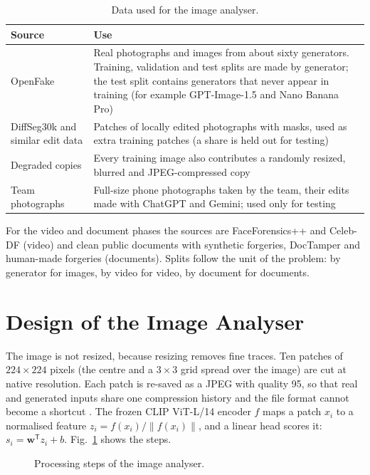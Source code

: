 \begin{table}[htbp]
\centering\small
\caption{Data used for the image analyser.}
\begin{tabularx}{\linewidth}{@{}p{3.3cm}X@{}}
\toprule
Source & Use\\
\midrule
OpenFake \cite{openfake} & Real photographs and images from about sixty generators. Training, validation and test splits are made by generator; the test split contains generators that never appear in training (for example GPT-Image-1.5 and Nano Banana Pro)\\
DiffSeg30k \cite{diffseg} and similar edit data & Patches of locally edited photographs with masks, used as extra training patches (a share is held out for testing)\\
Degraded copies & Every training image also contributes a randomly resized, blurred and JPEG-compressed copy\\
Team photographs & Full-size phone photographs taken by the team, their edits made with ChatGPT and Gemini; used only for testing\\
\bottomrule
\end{tabularx}
\end{table}

For the video and document phases the sources are FaceForensics++ and Celeb-DF (video) and clean public documents with synthetic forgeries, DocTamper and human-made forgeries (documents). Splits follow the unit of the problem: by generator for images, by video for video, by document for documents.

\section{Design of the Image Analyser}
The image is not resized, because resizing removes fine traces. Ten patches of $224\times224$ pixels (the centre and a $3\times3$ grid spread over the image) are cut at native resolution. Each patch is re-saved as a JPEG with quality 95, so that real and generated inputs share one compression history and the file format cannot become a shortcut \cite{grommelt}. The frozen CLIP ViT-L/14 encoder $f$ maps a patch $x_i$ to a normalised feature $z_i=f(x_i)/\lVert f(x_i)\rVert$, and a linear head scores it: $s_i=\mathbf{w}^{\mathsf T}z_i+b$. Fig.~\ref{fig:pipe} shows the steps.

\begin{figure}[htbp]
  \centering
  
  \caption{Processing steps of the image analyser.}\label{fig:pipe}
\end{figure}

